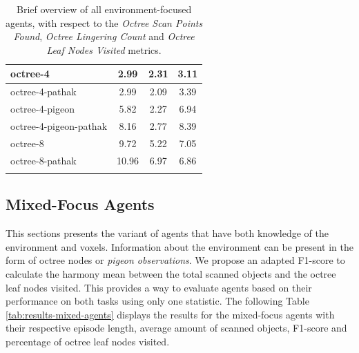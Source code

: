 \begin{longtable}{|l|c|c|c|}
octree-4 & 2.99 & {\cellcolor[HTML]{EBF2F0}} \color[HTML]{000000} 2.31 & 3.11 \\ \hline
octree-4-pathak & 2.99 & {\cellcolor[HTML]{EBF2F0}} \color[HTML]{000000} 2.09 & 3.39 \\ \hline
octree-4-pigeon & 5.82 & {\cellcolor[HTML]{EBF2F0}} \color[HTML]{000000} 2.27 & 6.94 \\ \hline
octree-4-pigeon-pathak & 8.16 & {\cellcolor[HTML]{E8F1EF}} \color[HTML]{000000} 2.77 & 8.39 \\ \hline
octree-8 & 9.72 & {\cellcolor[HTML]{DDEBE8}} \color[HTML]{000000} 5.22 & 7.05 \\ \hline
octree-8-pathak & 10.96 & {\cellcolor[HTML]{D5E7E3}} \color[HTML]{000000} 6.97 & 6.86 \\ \hline


    \caption{Brief overview of all environment-focused agents, with respect to the \textit{Octree Scan Points Found}, \textit{Octree Lingering Count} and \textit{Octree Leaf Nodes Visited} metrics.}
    \label{tab:RQ2-results-comparative-voxeloctree}
\end{longtable}


\subsection{Mixed-Focus Agents}
This sections presents the variant of agents that have both knowledge of the environment and voxels. Information about the environment can be present in the form of octree nodes or \textit{pigeon observations}. 
We propose an adapted F1-score \cite{f1score2022} to calculate the harmony mean between the total scanned objects and the octree leaf nodes visited. This provides a way to evaluate agents based on their performance on both tasks using only one statistic. 
\newpage
The following Table \ref{tab:results-mixed-agents} displays the results for the mixed-focus agents with their respective episode length, average amount of scanned objects, F1-score and percentage of octree leaf nodes visited.


